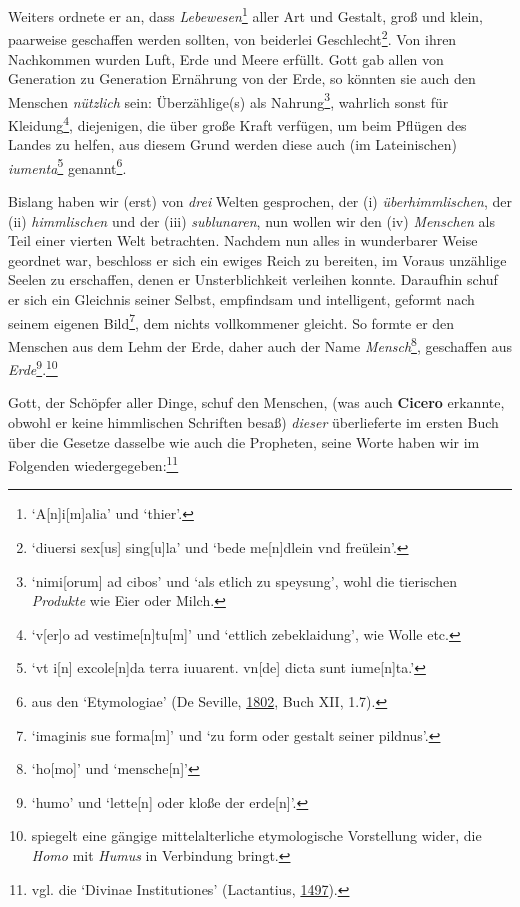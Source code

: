 \documentclass[
]{article}
\begin{document}
Weiters ordnete er an, dass \emph{Lebewesen}\footnote{`A{[}n{]}i{[}m{]}alia'
  und `thier'.} aller Art und Gestalt, groß und klein, paarweise
geschaffen werden sollten, von beiderlei Geschlecht\footnote{`diuersi
  sex{[}us{]} sing{[}u{]}la' und `bede me{[}n{]}dlein vnd freülein'.}.
Von ihren Nachkommen wurden Luft, Erde und Meere erfüllt. Gott gab allen
von Generation zu Generation Ernährung von der Erde, so könnten sie auch
den Menschen \emph{nützlich} sein: Überzählige(s) als
Nahrung\footnote{`nimi{[}orum{]} ad cibos' und `als etlich zu speysung',
  wohl die tierischen \emph{Produkte} wie Eier oder Milch.}, wahrlich
sonst für Kleidung\footnote{`v{[}er{]}o ad vestime{[}n{]}tu{[}m{]}' und
  `ettlich zebeklaidung', wie Wolle etc.}, diejenigen, die über große
Kraft verfügen, um beim Pflügen des Landes zu helfen, aus diesem Grund
werden diese auch (im Lateinischen) \emph{iumenta}\footnote{`vt i{[}n{]}
  excole{[}n{]}da terra iuuarent. vn{[}de{]} dicta sunt iume{[}n{]}ta.'}
genannt\footnote{aus den `Etymologiae' (De Seville,
  \href{https://books.google.com/books?id=wb8Z_vlSyJwC}{1802}, Buch XII,
  1.7).}.

Bislang haben wir (erst) von \emph{drei} Welten gesprochen, der (i)
\emph{überhimmlischen}, der (ii) \emph{himmlischen} und der (iii)
\emph{sublunaren}, nun wollen wir den (iv) \emph{Menschen} als Teil
einer vierten Welt betrachten. Nachdem nun alles in wunderbarer Weise
geordnet war, beschloss er sich ein ewiges Reich zu bereiten, im Voraus
unzählige Seelen zu erschaffen, denen er Unsterblichkeit verleihen
konnte. Daraufhin schuf er sich ein Gleichnis seiner Selbst, empfindsam
und intelligent, geformt nach seinem eigenen Bild\footnote{`imaginis sue
  forma{[}m{]}' und `zu form oder gestalt seiner pildnus'.}, dem nichts
vollkommener gleicht. So formte er den Menschen aus dem Lehm der Erde,
daher auch der Name \emph{Mensch}\footnote{`ho{[}mo{]}' und
  `mensche{[}n{]}'}, geschaffen aus \emph{Erde}\footnote{`humo' und
  `lette{[}n{]} oder kloße der erde{[}n{]}'.}.\footnote{spiegelt eine
  gängige mittelalterliche etymologische Vorstellung wider, die
  \emph{Homo} mit \emph{Humus} in Verbindung bringt.}

Gott, der Schöpfer aller Dinge, schuf den Menschen, (was auch
\textbf{Cicero} erkannte, obwohl er keine himmlischen Schriften besaß)
\emph{dieser} überlieferte im ersten Buch über die Gesetze dasselbe wie
auch die Propheten, seine Worte haben wir im Folgenden
wiedergegeben:\footnote{vgl. die `Divinae Institutiones' (Lactantius,
  \href{https://books.google.com/books?id=qGsnghsi3uUC}{1497}).}
\end{document}
